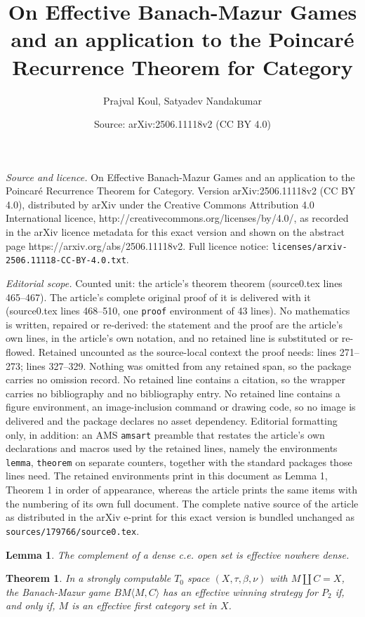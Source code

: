 \documentclass[10pt,a4paper]{amsart}
\title{On Effective Banach-Mazur Games and an application to the Poincar\'e Recurrence Theorem for Category}
\author{Prajval Koul, Satyadev Nandakumar}
\date{Source: arXiv:2506.11118v2 (CC BY 4.0)}
\newtheorem{lemma}{Lemma}
\newtheorem{theorem}{Theorem}
\begin{document}
\maketitle

\noindent\emph{Source and licence.} On Effective Banach-Mazur Games and an application to the Poincar\'e Recurrence Theorem for Category. Version arXiv:2506.11118v2 (CC BY 4.0), distributed by arXiv under the Creative Commons Attribution 4.0 International licence, http://creativecommons.org/licenses/by/4.0/, as recorded in the arXiv licence metadata for this exact version and shown on the abstract page https://arxiv.org/abs/2506.11118v2. Full licence notice: \texttt{licenses/arxiv-2506.11118-CC-BY-4.0.txt}.\par\smallskip

\noindent\textit{Editorial scope.} Counted unit: the article's theorem theorem (source0.tex lines 465--467). The article's complete original proof of it is delivered with it (source0.tex lines 468--510, one \texttt{proof} environment of 43 lines). No mathematics is written, repaired or re-derived: the statement and the proof are the article's own lines, in the article's own notation, and no retained line is substituted or re-flowed.  Retained uncounted as the source-local context the proof needs: lines 271--273; lines 327--329.  Nothing was omitted from any retained span, so the package carries no omission record.  No retained line contains a citation, so the wrapper carries no bibliography and no bibliography entry.  No retained line contains a figure environment, an image-inclusion command or drawing code, so no image is delivered and the package declares no asset dependency.  Editorial formatting only, in addition: an AMS \texttt{amsart} preamble that restates the article's own declarations and macros used by the retained lines, namely the environments \texttt{lemma}, \texttt{theorem} on separate counters, together with the standard packages those lines need.  The retained environments print in this document as Lemma 1, Theorem 1 in order of appearance, whereas the article prints the same items with the numbering of its own full document.  The complete native source of the article as distributed in the arXiv e-print for this exact version is bundled unchanged as \texttt{sources/179766/source0.tex}.
\begin{lemma}\label{lem:cedensecomp}
	The complement of a dense c.e. open set is effective nowhere dense. 
\end{lemma}

\begin{theorem}\label{thm:effbm1}
	In a strongly computable $T_0$ space $(X,\tau,\beta,\nu)$ with $M\coprod C=X$, the Banach-Mazur game $BM\langle M,C\rangle$ has an effective winning strategy for $P_2$ if, and only if, $M$ is an effective first category set in $X$. 
\end{theorem}
\end{document}
